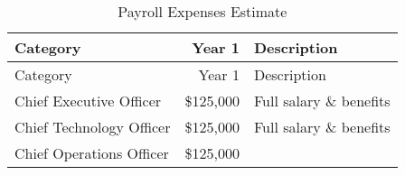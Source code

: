 \documentclass[10pt,openany]{book}
\begin{document}
\begin{longtable}[]{@{}lrl@{}}
\caption{Payroll Expenses Estimate}\tabularnewline
\toprule
\begin{minipage}[b]{0.34\columnwidth}\raggedright
Category\strut
\end{minipage} & \begin{minipage}[b]{0.16\columnwidth}\raggedleft
Year 1\strut
\end{minipage} & \begin{minipage}[b]{0.32\columnwidth}\raggedright
Description\strut
\end{minipage}\tabularnewline
\midrule
\endfirsthead
\toprule
\begin{minipage}[b]{0.34\columnwidth}\raggedright
Category\strut
\end{minipage} & \begin{minipage}[b]{0.16\columnwidth}\raggedleft
Year 1\strut
\end{minipage} & \begin{minipage}[b]{0.32\columnwidth}\raggedright
Description\strut
\end{minipage}\tabularnewline
\midrule
\endhead
\begin{minipage}[t]{0.34\columnwidth}\raggedright
Chief Executive Officer\strut
\end{minipage} & \begin{minipage}[t]{0.16\columnwidth}\raggedleft
\$125,000\strut
\end{minipage} & \begin{minipage}[t]{0.32\columnwidth}\raggedright
Full salary \& benefits\strut
\end{minipage}\tabularnewline
\begin{minipage}[t]{0.34\columnwidth}\raggedright
Chief Technology Officer\strut
\end{minipage} & \begin{minipage}[t]{0.16\columnwidth}\raggedleft
\$125,000\strut
\end{minipage} & \begin{minipage}[t]{0.32\columnwidth}\raggedright
Full salary \& benefits\strut
\end{minipage}\tabularnewline
\begin{minipage}[t]{0.34\columnwidth}\raggedright
Chief Operations Officer\strut
\end{minipage} & \begin{minipage}[t]{0.16\columnwidth}\raggedleft
\$125,000\strut
\end{minipage} & \begin{minipage}[t]{0.32\columnwidth}\raggedright

\end{minipage}
\end{longtable}
\end{document}
